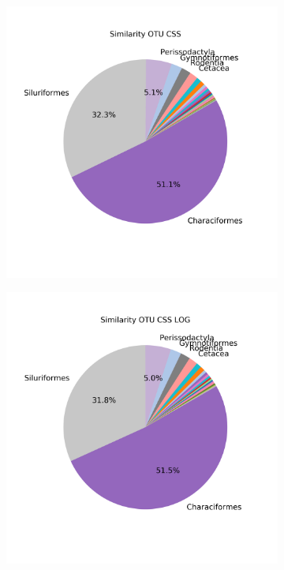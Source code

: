 \begin{figure}[!h]
\begin{subfigure}{0.45\textwidth}
		\caption{}
		\label{fig:simmeanotucsslog}
	\end{subfigure}\\
	\begin{subfigure}{0.45\textwidth}
	\includegraphics[width=\textwidth]{rfr_sim_sum_pieOTU CSS}
	\caption{}
	\label{fig:simsumotucss}
	\end{subfigure}
	\begin{subfigure}{0.45\textwidth}
	\includegraphics[width=\textwidth]{rfr_sim_sum_pieOTU CSS LOG}
	\caption{}
	\label{fig:simsumotucsslog}
	\end{subfigure}


\end{figure}
